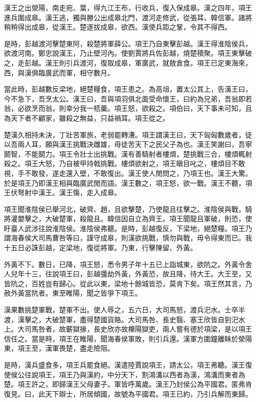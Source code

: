 漢王之出滎陽，南走宛、葉，得九江王布，行收兵，復入保成皋。漢之四年，項王進兵圍成皋。漢王逃，獨與滕公出成皋北門，渡河走修武，從張耳、韓信軍。諸將稍稍得出成皋，從漢王。楚遂拔成皋，欲西。漢使兵距之鞏，令其不得西。

是時，彭越渡河擊楚東阿，殺楚將軍薛公。項王乃自東擊彭越。漢王得淮陰侯兵，欲渡河南。鄭忠說漢王，乃止壁河內。使劉賈將兵佐彭越，燒楚積聚。項王東擊破之，走彭越。漢王則引兵渡河，復取成皋，軍廣武，就敖倉食。項王已定東海來，西，與漢俱臨廣武而軍，相守數月。

當此時，彭越數反梁地，絕楚糧食，項王患之。為高俎，置太公其上，告漢王曰，今不急下，吾烹太公。漢王曰，吾與項羽俱北面受命懷王，曰約為兄弟，吾翁即若翁，必欲烹而翁，則幸分我一桮羹。項王怒，欲殺之。項伯曰，天下事未可知，且為天下者不顧家，雖殺之無益，只益禍耳。項王從之。

楚漢久相持未決，丁壯苦軍旅，老弱罷轉漕。項王謂漢王曰，天下匈匈數歲者，徒以吾兩人耳，願與漢王挑戰決雌雄，毋徒苦天下之民父子為也。漢王笑謝曰，吾寧鬬智，不能鬬力。項王令壯士出挑戰。漢有善騎射者樓煩，楚挑戰三合，樓煩輒射殺之。項王大怒，乃自被甲持戟挑戰。樓煩欲射之，項王瞋目叱之，樓煩目不敢視，手不敢發，遂走還入壁，不敢復出。漢王使人閒問之，乃項王也。漢王大驚。於是項王乃即漢王相與臨廣武閒而語。漢王數之，項王怒，欲一戰。漢王不聽，項王伏弩射中漢王。漢王傷，走入成皋。

項王聞淮陰侯已舉河北，破齊、趙，且欲擊楚，乃使龍且往擊之。淮陰侯與戰，騎將灌嬰擊之，大破楚軍，殺龍且。韓信因自立為齊王。項王聞龍且軍破，則恐，使盱臺人武涉往說淮陰侯。淮陰侯弗聽。是時，彭越復反，下梁地，絕楚糧。項王乃謂海春侯大司馬曹咎等曰，謹守成皋，則漢欲挑戰，慎勿與戰，毋令得東而已。我十五日必誅彭越，定梁地，復從將軍。乃東，行擊陳留、外黃。

外黃不下。數日，已降，項王怒，悉令男子年十五已上詣城東，欲阬之。外黃令舍人兒年十三，往說項王曰，彭越彊劫外黃，外黃恐，故且降，待大王。大王至，又皆阬之，百姓豈有歸心。從此以東，梁地十餘城皆恐，莫肯下矣。項王然其言，乃赦外黃當阬者。東至睢陽，聞之皆爭下項王。

漢果數挑楚軍戰，楚軍不出。使人辱之，五六日，大司馬怒，渡兵汜水。士卒半渡，漢擊之，大破楚軍，盡得楚國貨賂。大司馬咎、長史翳、塞王欣皆自剄汜水上。大司馬咎者，故蘄獄掾，長史欣亦故櫟陽獄吏，兩人嘗有德於項梁，是以項王信任之。當是時，項王在睢陽，聞海春侯軍敗，則引兵還。漢軍方圍鐘離眛於滎陽東，項王至，漢軍畏楚，盡走險阻。

是時，漢兵盛食多，項王兵罷食絕。漢遣陸賈說項王，請太公，項王弗聽。漢王復使侯公往說項王，項王乃與漢約，中分天下，割鴻溝以西者為漢，鴻溝而東者為楚。項王許之，即歸漢王父母妻子。軍皆呼萬歲。漢王乃封侯公為平國君。匿弗肯復見。曰，此天下辯士，所居傾國，故號為平國君。項王已約，乃引兵解而東歸。

